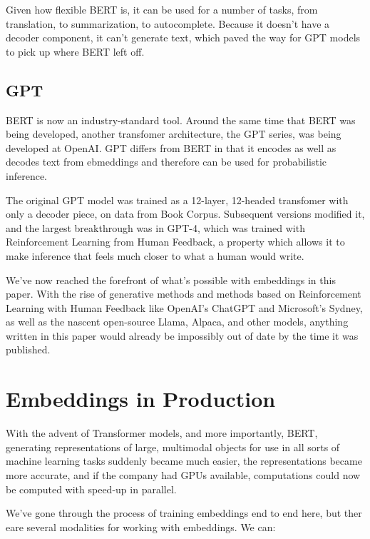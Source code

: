 \documentclass[11pt, table]{diazessay} %
\begin{document}
\begin{sloppypar}
Given how flexible BERT is, it can be used for a number of tasks, from translation, to summarization, to autocomplete. Because it doesn't have a decoder component, it can't generate text, which paved the way for GPT models to pick up where BERT left off. 

\subsection{GPT}
BERT is now an industry-standard tool. Around the same time that BERT was being developed, another transfomer architecture, the GPT series, was being developed at OpenAI. GPT differs from BERT in that it encodes as well as decodes text from ebmeddings and therefore can be used for probabilistic inference. 

The original GPT model was trained as a 12-layer, 12-headed transfomer with only a decoder piece, on data from Book Corpus. Subsequent versions modified it, and the largest breakthrough was in GPT-4, which was trained with Reinforcement Learning from Human Feedback, a property which allows it to make inference that feels much closer to what a human would write. 

We've now reached the forefront of what's possible with embeddings in this paper. With the rise of generative methods and methods based on Reinforcement Learning with Human Feedback like OpenAI's ChatGPT and Microsoft's Sydney, as well as the nascent open-source Llama, Alpaca, and other models,  anything written in this paper would already be impossibly out of date by the time it was published. 

\section{Embeddings in Production}

With the advent of Transformer models, and more importantly, BERT, generating representations of large, multimodal objects for use in all sorts of machine learning tasks suddenly became much easier, the representations became more accurate, and if the company had GPUs available, computations could now be computed with speed-up in parallel. 

We've gone through the process of training embeddings end to end here, but ther eare several modalities for working with embeddings. We can: 


\end{sloppypar}
\end{document}
